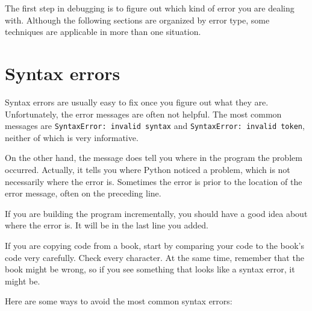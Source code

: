 \documentclass[10pt]{book}
\begin{document}

The first step in debugging is to figure out which kind of
error you are dealing with.  Although the following sections are
organized by error type, some techniques are
applicable in more than one situation.


\section{Syntax errors}


Syntax errors are usually easy to fix once you figure out what they
are.  Unfortunately, the error messages are often not helpful.
The most common messages are {\tt SyntaxError: invalid syntax} and
{\tt SyntaxError: invalid token}, neither of which is very informative.

On the other hand, the message does tell you where in the program the
problem occurred.  Actually, it tells you where Python
noticed a problem, which is not necessarily where the error
is.  Sometimes the error is prior to the location of the error
message, often on the preceding line.


If you are building the program incrementally, you should have
a good idea about where the error is.  It will be in the last
line you added.

If you are copying code from a book, start by comparing
your code to the book's code very carefully.  Check every character.
At the same time, remember that the book might be wrong, so
if you see something that looks like a syntax error, it might be.

Here are some ways to avoid the most common syntax errors:

\end{document}
